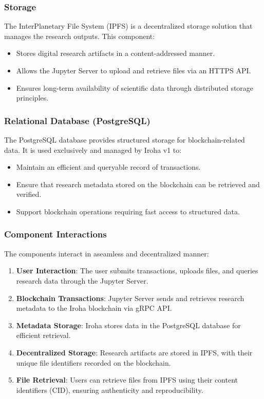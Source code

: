\documentclass[final]{rc-book-2.14}
\begin{document}
\subsubsection{Storage}
The InterPlanetary File System (IPFS) is a decentralized storage solution that manages the research outputs. This component:
\begin{itemize}
    \item Stores digital research artifacts in a content-addressed manner.
    \item Allows the Jupyter Server to upload and retrieve files via an HTTPS API.
    \item Ensures long-term availability of scientific data through distributed storage principles.
\end{itemize}


\subsubsection{Relational Database (PostgreSQL)}
The PostgreSQL database provides structured storage for blockchain-related data. It is used exclusively and managed by Iroha v1 to:
\begin{itemize}
    \item Maintain an efficient and queryable record of transactions.
    \item Ensure that research metadata stored on the blockchain can be retrieved and verified.
    \item Support blockchain operations requiring fast access to structured data.
\end{itemize}

\subsubsection{Component Interactions}
The components interact in aseamless and decentralized manner:
\begin{enumerate}
    \item \textbf{User Interaction}: The user submits transactions, uploads files, and queries research data through the Jupyter Server.
    \item \textbf{Blockchain Transactions}: Jupyter Server sends and retrieves research metadata to the Iroha blockchain via gRPC API.
    \item \textbf{Metadata Storage}: Iroha stores data in the PostgreSQL database for efficient retrieval.
    \item \textbf{Decentralized Storage}: Research artifacts are stored in IPFS, with their unique file identifiers recorded on the blockchain.
    \item \textbf{File Retrieval}: Users can retrieve files from IPFS using their content identifiers (CID), ensuring authenticity and reproducibility.
\end{enumerate}
\end{document}

